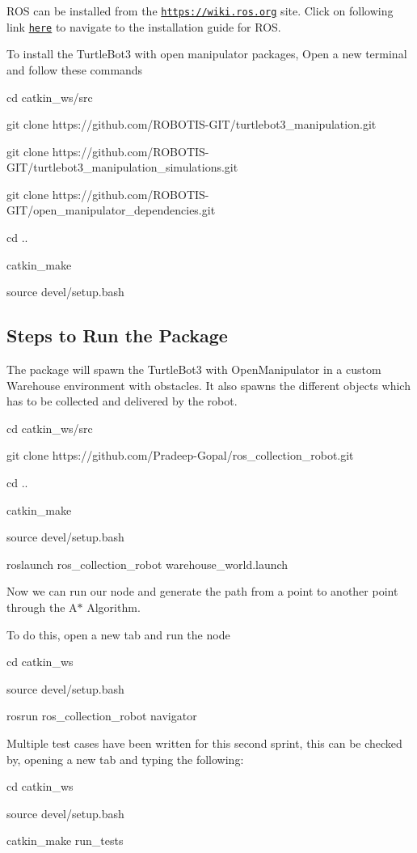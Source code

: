 R\+OS can be installed from the \href{https://wiki.ros.org}{\tt https\+://wiki.\+ros.\+org} site. Click on following link \href{https://wiki.ros.org/melodic/Installation}{\tt here} to navigate to the installation guide for R\+OS.

To install the Turtle\+Bot3 with open manipulator packages, Open a new terminal and follow these commands 
\begin{DoxyCode}
cd catkin\_ws/src

git clone https://github.com/ROBOTIS-GIT/turtlebot3\_manipulation.git

git clone https://github.com/ROBOTIS-GIT/turtlebot3\_manipulation\_simulations.git

git clone https://github.com/ROBOTIS-GIT/open\_manipulator\_dependencies.git

cd ..

catkin\_make

source devel/setup.bash
\end{DoxyCode}
 \subsection*{Steps to Run the Package}

The package will spawn the Turtle\+Bot3 with Open\+Manipulator in a custom Warehouse environment with obstacles. It also spawns the different objects which has to be collected and delivered by the robot.


\begin{DoxyCode}
cd catkin\_ws/src

git clone https://github.com/Pradeep-Gopal/ros\_collection\_robot.git

cd ..

catkin\_make

source devel/setup.bash

roslaunch ros\_collection\_robot warehouse\_world.launch
\end{DoxyCode}


Now we can run our node and generate the path from a point to another point through the A$\ast$ Algorithm.

To do this, open a new tab and run the node


\begin{DoxyCode}
cd catkin\_ws

source devel/setup.bash

rosrun ros\_collection\_robot navigator
\end{DoxyCode}


Multiple test cases have been written for this second sprint, this can be checked by, opening a new tab and typing the following\+:


\begin{DoxyCode}
cd catkin\_ws

source devel/setup.bash

catkin\_make run\_tests
\end{DoxyCode}
 